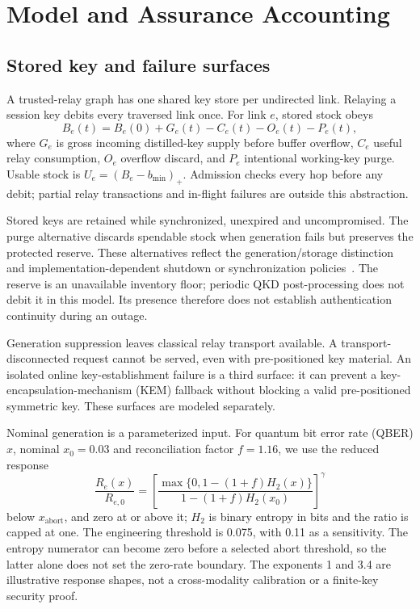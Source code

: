 \documentclass[conference,a4paper]{IEEEtran}
\begin{document}
\section{Model and Assurance Accounting}\label{sec:model}
\subsection{Stored key and failure surfaces}
A trusted-relay graph has one shared key store per undirected link. Relaying a session key debits every traversed link once. For link $e$, stored stock obeys
\begin{equation}\label{eq:stock}
B_e(t)=B_e(0)+G_e(t)-C_e(t)-O_e(t)-P_e(t),
\end{equation}
where $G_e$ is gross incoming distilled-key supply before buffer overflow, $C_e$ useful relay consumption, $O_e$ overflow discard, and $P_e$ intentional working-key purge. Usable stock is $U_e=(B_e-b_{\min})_+$. Admission checks every hop before any debit; partial relay transactions and in-flight failures are outside this abstraction.

Stored keys are retained while synchronized, unexpired and uncompromised. The purge alternative discards spendable stock when generation fails but preserves the protected reserve. These alternatives reflect the generation/storage distinction~\cite{itu} and implementation-dependent shutdown or synchronization policies~\cite{tysowski}. The reserve is an unavailable inventory floor; periodic QKD post-processing does not debit it in this model. Its presence therefore does not establish authentication continuity during an outage.

Generation suppression leaves classical relay transport available. A transport-disconnected request cannot be served, even with pre-positioned key material. An isolated online key-establishment failure is a third surface: it can prevent a key-encapsulation-mechanism (KEM) fallback without blocking a valid pre-positioned symmetric key. These surfaces are modeled separately.

Nominal generation is a parameterized input. For quantum bit error rate (QBER) $x$, nominal $x_0=0.03$ and reconciliation factor $f=1.16$, we use the reduced response
\begin{equation}\label{eq:rate}
\frac{R_e(x)}{R_{e,0}}=\left[\frac{\max\{0,1-(1+f)H_2(x)\}}{1-(1+f)H_2(x_0)}\right]^{\gamma}
\end{equation}
below $x_{\mathrm{abort}}$, and zero at or above it; $H_2$ is binary entropy in bits and the ratio is capped at one. The engineering threshold is 0.075, with 0.11 as a sensitivity. The entropy numerator can become zero before a selected abort threshold, so the latter alone does not set the zero-rate boundary. The exponents 1 and 3.4 are illustrative response shapes, not a cross-modality calibration or a finite-key security proof.
\end{document}
